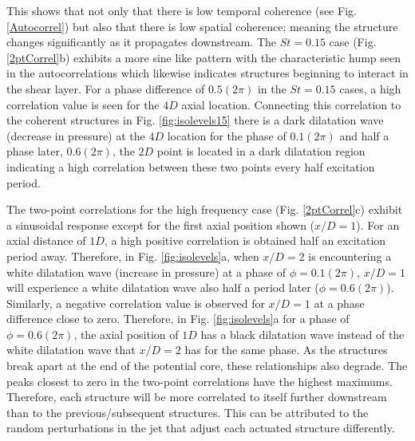 \documentclass[english]{aiaa-tc}
\begin{document}
This shows that not only that there is low temporal coherence (see Fig. \ref{Autocorrel}) but also that there is low spatial coherence; meaning the structure changes significantly as it propagates downstream.
The $St=0.15$ case (Fig. \ref{2ptCorrel}b) exhibits a more sine like pattern with the characteristic hump seen in the autocorrelations which likewise indicates structures beginning to interact in the shear layer.
For a phase difference of $0.5(2\pi)$ in the $St=0.15$ cases, a high correlation value is seen for the $4D$ axial location. Connecting this correlation to the coherent structures in Fig. \ref{fig:isolevels15} there is a dark dilatation wave (decrease in pressure) at the $4D$ location for the phase of $0.1(2\pi)$ and half a phase later, $0.6(2\pi)$, the $2D$ point is located in a dark dilatation region indicating a high correlation between these two points every half excitation period.

The two-point correlations for the high frequency case (Fig. \ref{2ptCorrel}c) exhibit a sinusoidal response except for the first axial position shown ($x/D=1$). For an axial distance of $1D$, a high positive correlation is obtained half an excitation period away.
Therefore, in Fig. \ref{fig:isolevels}a, when $x/D=2$ is encountering a white dilatation wave (increase in pressure) at a phase of $\phi=0.1(2\pi)$, $x/D=1$ will experience a white dilatation wave also half a period later ($\phi=0.6(2\pi)$). Similarly, a negative correlation value is observed for $x/D=1$ at a phase difference close to zero. Therefore, in Fig. \ref{fig:isolevels}a for a phase of $\phi=0.6(2\pi)$, the axial position of $1D$ has a black dilatation wave instead of the white dilatation wave that $x/D=2$ has for the same phase. As the structures break apart at the end of the potential core, these relationships also degrade.
The peaks closest to zero in the two-point correlations have the highest maximums. Therefore, each structure will be more correlated to itself further downstream than to the previous/subsequent structures. This can be attributed to the random perturbations in the jet that adjust each actuated structure differently.
\end{document}
